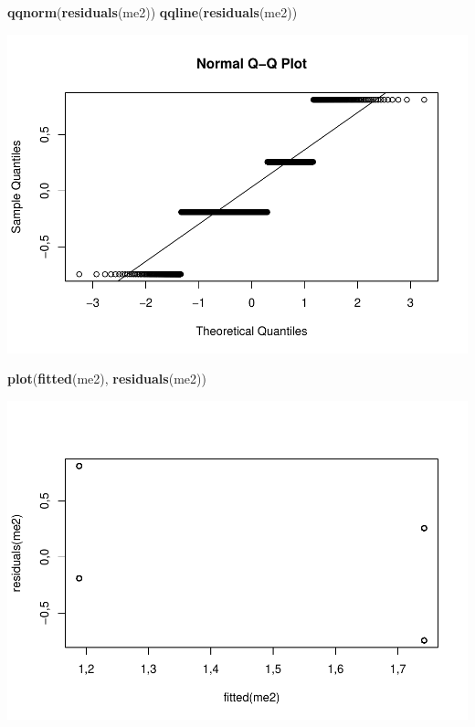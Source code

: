 \documentclass[]{article}
\newenvironment{Shaded}{\begin{snugshade}}{\end{snugshade}}
\newcommand{\KeywordTok}[1]{\textcolor[rgb]{0.13,0.29,0.53}{\textbf{#1}}}
\newcommand{\NormalTok}[1]{#1}
\begin{document}
\begin{Shaded}
\begin{Highlighting}[]
\KeywordTok{qqnorm}\NormalTok{(}\KeywordTok{residuals}\NormalTok{(me2))}
\KeywordTok{qqline}\NormalTok{(}\KeywordTok{residuals}\NormalTok{(me2))}
\end{Highlighting}
\end{Shaded}

\includegraphics{titanicDataClean_files/figure-latex/unnamed-chunk-25-3.pdf}

\begin{Shaded}
\begin{Highlighting}[]
\KeywordTok{plot}\NormalTok{(}\KeywordTok{fitted}\NormalTok{(me2), }\KeywordTok{residuals}\NormalTok{(me2))}
\end{Highlighting}
\end{Shaded}

\includegraphics{titanicDataClean_files/figure-latex/unnamed-chunk-25-4.pdf}
\end{document}
